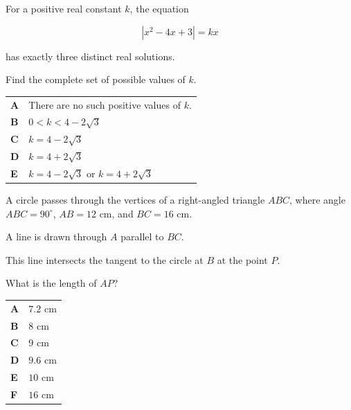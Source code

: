 \documentclass[11pt,a4paper]{article}
\begin{document}
\clearpage
\thispagestyle{djspaper}
\vspace*{8pt}
\begin{enumerate}[label=\textbf{\arabic*.},leftmargin=*,itemsep=0pt,start=19]
For a positive real constant $k$, the equation

\[
\left|x^2-4x+3\right|=kx
\]

has exactly three distinct real solutions.

Find the complete set of possible values of $k$.

\par\vspace*{12pt}
\begin{tabularx}{\linewidth}{@{}>{\bfseries}l Y@{}}
A &
There are no such positive values of $k$.
\\[0.8em]
B &
$0<k<4-2\sqrt{3}$
\\[0.8em]
C &
$k=4-2\sqrt{3}$
\\[0.8em]
D &
$k=4+2\sqrt{3}$
\\[0.8em]
E &
$k=4-2\sqrt{3}$ or $k=4+2\sqrt{3}$
\\
\end{tabularx}
\end{enumerate}
\clearpage
\thispagestyle{djspaper}
\vspace*{8pt}
\begin{enumerate}[label=\textbf{\arabic*.},leftmargin=*,itemsep=0pt,start=20]
\questionitem[Geometry]
A circle passes through the vertices of a right-angled triangle $ABC$, where angle $ABC = 90^\circ$, $AB = 12\text{ cm}$, and $BC = 16\text{ cm}$.

A line is drawn through $A$ parallel to $BC$. 

This line intersects the tangent to the circle at $B$ at the point $P$.

What is the length of $AP$?

\par\vspace*{12pt}
\begin{tabularx}{\linewidth}{@{}>{\bfseries}l Y@{}}
A &
$7.2\text{ cm}$
\\[0.8em]
B &
$8\text{ cm}$
\\[0.8em]
C &
$9\text{ cm}$
\\[0.8em]
D &
$9.6\text{ cm}$
\\[0.8em]
E &
$10\text{ cm}$
\\[0.8em]
F &
$16\text{ cm}$
\\
\end{tabularx}
\end{enumerate}
\end{document}
